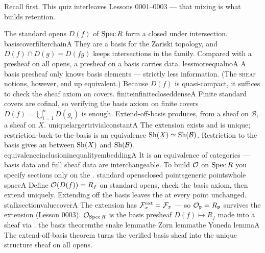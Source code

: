 Recall first. This quiz interleaves Lessons 0001--0003 --- that mixing is what builds retention.

\begin{quizlist}
\quizitem
  {The standard opens $D(f)$ of $\operatorname{Spec} R$ form a \underline{\hspace{2.2em}} closed under intersection.}
  {basis}{cover}{filter}{chain}{A}
  {They are a basis for the Zariski topology, and $D(f)\cap D(g)=D(fg)$ keeps intersections in the family.}
\quizitem
  {Compared with a presheaf on all opens, a presheaf on a basis carries \underline{\hspace{2.2em}} data.}
  {less}{more}{equal}{no}{A}
  {A basis presheaf only knows basis elements --- strictly less information. (The \textsc{sheaf} notions, however, end up equivalent.)}
\quizitem
  {Because $D(f)$ is quasi-compact, it suffices to check the sheaf axiom on \underline{\hspace{2.2em}} covers.}
  {finite}{infinite}{closed}{dense}{A}
  {Finite standard covers are cofinal, so verifying the basis axiom on finite covers $D(f)=\bigcup_{i=1}^n D(g_i)$ is enough.}
\quizitem
  {Extend-off-basis produces, from a sheaf on $\mathcal B$, a \underline{\hspace{2.2em}} sheaf on $X$.}
  {unique}{larger}{trivial}{constant}{A}
  {The extension exists and is unique; restriction-back-to-the-basis is an equivalence $\operatorname{Sh}(X)\simeq\operatorname{Sh}(\mathcal B)$.}
\quizitem
  {Restriction to the basis gives an \underline{\hspace{2.2em}} between $\operatorname{Sh}(X)$ and $\operatorname{Sh}(\mathcal B)$.}
  {equivalence}{inclusion}{inequality}{embedding}{A}
  {It is an equivalence of categories --- basis data and full sheaf data are interchangeable.}
\quizitem
  {To build $\mathcal{O}$ on $\operatorname{Spec} R$ you specify sections only on the \underline{\hspace{2.2em}}.}
  {standard opens}{closed points}{generic points}{whole space}{A}
  {Define $\mathcal{O}(D(f))=R_f$ on standard opens, check the basis axiom, then extend uniquely.}
\quizitem
  {Extending off the basis leaves the \underline{\hspace{2.2em}} at every point unchanged.}
  {stalk}{section}{value}{cover}{A}
  {The extension has $\mathcal{F}^{\mathrm{ext}}_x=\mathcal{F}_x$ --- so $\mathcal{O}_{\mathfrak{p}}=R_{\mathfrak{p}}$ survives the extension (Lesson 0003).}
\quizitem
  {$\mathcal{O}_{\operatorname{Spec} R}$ is the basis presheaf $D(f)\mapsto R_f$ made into a sheaf via \underline{\hspace{2.2em}}.}
  {the basis theorem}{the snake lemma}{the Zorn lemma}{the Yoneda lemma}{A}
  {The extend-off-basis theorem turns the verified basis sheaf into the unique structure sheaf on all opens.}
\end{quizlist}

